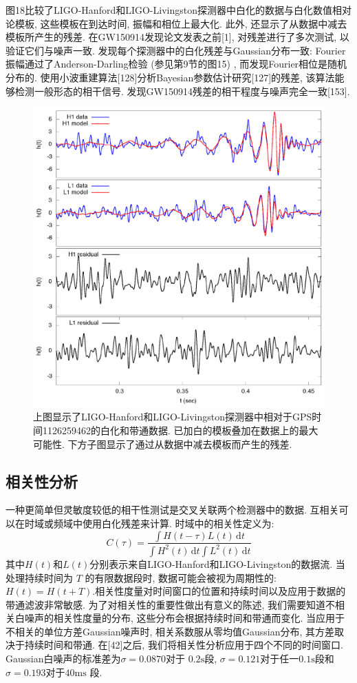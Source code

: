 \documentclass[a4paper]{\documentclassname}
\def\d{\mathrm{d}}
\def\t{\text}
\theoremstyle{definition}
\begin{document}
图18比较了LIGO-Hanford和LIGO-Livingston探测器中白化的数据与白化数值相对论模板, 这些模板在到达时间, 振幅和相位上最大化. 此外, 还显示了从数据中减去模板所产生的残差. 在GW150914发现论文发表之前[1], 对残差进行了多次测试, 以验证它们与噪声一致. 发现每个探测器中的白化残差与Gaussian分布一致: Fourier振幅通过了Anderson-Darling检验 (参见第9节的图15) , 而发现Fourier相位是随机分布的. 使用小波重建算法[128]分析Bayesian参数估计研究[127]的残差, 该算法能够检测一般形态的相干信号. 发现GW150914残差的相干程度与噪声完全一致[153]. 
\begin{figure}[htbp]
    \centering
    \includegraphics{img/18.jpg}
    \caption{
        上图显示了LIGO-Hanford和LIGO-Livingston探测器中相对于GPS时间1126259462的白化和带通数据. 已加白的模板叠加在数据上的最大可能性. 下方子图显示了通过从数据中减去模板而产生的残差. 
    }
\end{figure}

\subsection{相关性分析}

一种更简单但灵敏度较低的相干性测试是交叉关联两个检测器中的数据. 互相关可以在时域或频域中使用白化残差来计算. 时域中的相关性定义为: 
\begin{equation}
    C(\tau)=\frac{\int H(t-\tau)L(t)\,\d t}{\int H^2(t)\,\d t\int L^2(t)\,\d t}
\end{equation}
其中$H(t)$和$L(t)$分别表示来自LIGO-Hanford和LIGO-Livingston的数据流. 当处理持续时间为 $T$ 的有限数据段时, 数据可能会被视为周期性的: $H(t) = H (t+T) $.相关性度量对时间窗口的位置和持续时间以及应用于数据的带通滤波非常敏感. 为了对相关性的重要性做出有意义的陈述, 我们需要知道不相关白噪声的相关性度量的分布, 这些分布会根据持续时间和带通而变化. 当应用于不相关的单位方差Gaussian噪声时, 相关系数服从零均值Gaussian分布, 其方差取决于持续时间和带通. 在[42]之后, 我们将相关性分析应用于四个不同的时间窗口. Gaussian白噪声的标准差为$\sigma=0.0870$对于 $0.2 \t{s}$段, $\sigma = 0.121$对于任一$0.1 \t{s}$段和$\sigma=0.193$对于$40 \t{ms}$ 段. 
\end{document}
